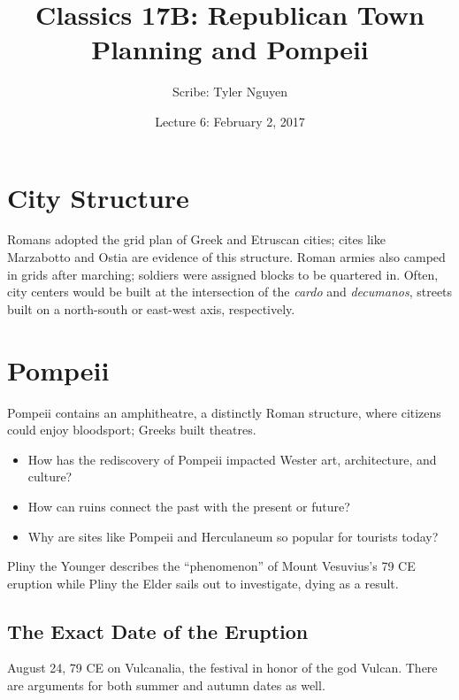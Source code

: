 \documentclass{article}
\begin{document}
\title{Classics 17B: Republican Town Planning and Pompeii}
\author{Scribe: Tyler Nguyen}
\date{Lecture 6: February 2, 2017}
\maketitle
\section{City Structure}
Romans adopted the grid plan of Greek and Etruscan cities; cites like Marzabotto and Ostia are evidence of this structure.  Roman armies also camped in grids after marching; soldiers were assigned blocks to be quartered in.  Often, city centers would be built at the intersection of the \textit{cardo} and \textit{decumanos}, streets built on a north-south or east-west axis, respectively.
\section{Pompeii}
Pompeii contains an amphitheatre, a distinctly Roman structure, where citizens could enjoy bloodsport; Greeks built theatres.
\begin{itemize}
\item How has the rediscovery of Pompeii impacted Wester art, architecture, and culture?
\item How can ruins connect the past with the present or future?
\item Why are sites like Pompeii and Herculaneum so popular for tourists today?
\end{itemize}
Pliny the Younger describes the ``phenomenon'' of Mount Vesuvius's 79 CE eruption while Pliny the Elder sails out to investigate, dying as a result.
\subsection{The Exact Date of the Eruption}
August 24, 79 CE on Vulcanalia, the festival in honor of the god Vulcan.  There are arguments for both summer and autumn dates as well.
\end{document}
